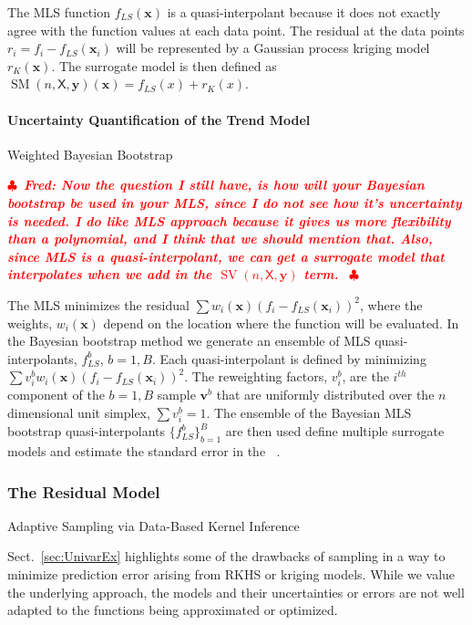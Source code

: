 \documentclass[11pt]{NSFamsart}
\DeclareMathOperator{\QOI}{QOI} %
\DeclareMathOperator{\APP}{\widehat{\QOI}}
\DeclareMathOperator{\SURR}{SM} %
\DeclareMathOperator{\SVAR}{SV} %
\newcommand{\MLS}{\textrm{MLS}\xspace} %
\newcommand{\mX}{\mathsf{X}}
\newcommand{\bx}{{\boldsymbol{x}}}
\newcommand{\bv}{{\boldsymbol{v}}}
\newcommand{\by}{{\boldsymbol{y}}}
\newif\ifnotesw \noteswtrue
\newcommand{\notes}[1]{\ifnotesw \textcolor{red}{  $\clubsuit$\ {\sf \bf \it  #1}\ $\clubsuit$  }\fi}
\begin{document}
The MLS function $f_{LS}(\bx)$ is a quasi-interpolant because it does not exactly agree with the function values at each data point.  The residual at the data points $r_i = f_i - f_{LS}(\bx_i)$ will be represented by a Gaussian process kriging model $r_{K}(\bx)$.
The surrogate model is then defined as $\SURR(n,\mX,\by)(\bx)=f_{LS}(x) + r_{K}(x)$.  


\paragraph*{Uncertainty Quantification of the Trend Model} 
Weighted Bayesian Bootstrap

\notes{Fred: Now the question I still have, is how will your Bayesian bootstrap be used in your \MLS, since I do not see how it's uncertainty is needed.  I do like \MLS approach because it gives us more flexibility than a polynomial, and I think that we should mention that.  Also, since \MLS is a quasi-interpolant, we can get a surrogate model that interpolates when we add in the $\SVAR(n,\mX,\by)$ term.   }

The MLS minimizes the residual $\sum w_i(\bx)(f_i - f_{LS}(\bx_i))^2$, where the weights, $w_i(\bx)$ depend on the location where the function will be evaluated. In the Bayesian bootstrap method \cite{rubin1981bayesian, efron1986bootstrap, efron2016computer} we generate an ensemble of MLS quasi-interpolants, $f_{LS}^b$, $b=1,B$. Each quasi-interpolant is defined by minimizing $\sum v_i^b w_i(\bx)(f_i - f_{LS}(\bx_i))^2$.   The reweighting factors, $v_i^b$, are the $i^{th}$ component of the $b=1,B$ sample $\bv^b$ that are uniformly distributed over the $n$ dimensional unit simplex, $\sum v_i^b = 1 $.  The ensemble of the Bayesian MLS bootstrap quasi-interpolants $\{f_{LS}^b \}_{b=1}^B$ are then used define multiple surrogate models and estimate the standard error in the $\APP$. 

\subsubsection{The Residual Model} \label{sec:kerinferdata}
Adaptive Sampling via Data-Based Kernel Inference 

Sect.\  \ref{sec:UnivarEx} highlights some of the drawbacks of sampling in a way to minimize prediction error arising from RKHS or kriging models.  While we value the underlying approach, the models and their uncertainties or errors are not well adapted to the functions being approximated or optimized.
\end{document}
